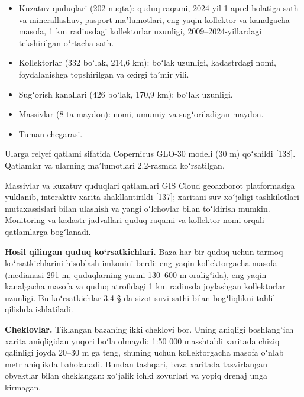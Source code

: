\begin{itemize}
\tightlist
\item
  Kuzatuv quduqlari (202 nuqta): quduq raqami, 2024-yil 1-aprel holatiga
  sath va minerallashuv, pasport maʼlumotlari, eng yaqin kollektor va
  kanalgacha masofa, 1 km radiusdagi kollektorlar uzunligi,
  2009--2024-yillardagi tekshirilgan oʻrtacha sath.
\item
  Kollektorlar (332 boʻlak, 214,6 km): boʻlak uzunligi, kadastrdagi
  nomi, foydalanishga topshirilgan va oxirgi taʼmir yili.
\item
  Sugʻorish kanallari (426 boʻlak, 170,9 km): boʻlak uzunligi.
\item
  Massivlar (8 ta maydon): nomi, umumiy va sugʻoriladigan maydon.
\item
  Tuman chegarasi.
\end{itemize}

Ularga relyef qatlami sifatida Copernicus GLO-30 modeli (30 m) qoʻshildi
{[}138{]}. Qatlamlar va ularning maʼlumotlari 2.2-rasmda koʻrsatilgan.



Massivlar va kuzatuv quduqlari qatlamlari GIS Cloud geoaxborot
platformasiga yuklanib, interaktiv xarita shakllantirildi {[}137{]};
xaritani suv xoʻjaligi tashkilotlari mutaxassislari bilan ulashish va
yangi oʻlchovlar bilan toʻldirish mumkin. Monitoring va kadastr
jadvallari quduq raqami va kollektor nomi orqali qatlamlarga bogʻlanadi.

\textbf{Hosil qilingan quduq koʻrsatkichlari.} Baza har bir quduq uchun
tarmoq koʻrsatkichlarini hisoblash imkonini berdi: eng yaqin
kollektorgacha masofa (medianasi 291 m, quduqlarning yarmi 130--600 m
oraligʻida), eng yaqin kanalgacha masofa va quduq atrofidagi 1 km
radiusda joylashgan kollektorlar uzunligi. Bu koʻrsatkichlar 3.4-§ da
sizot suvi sathi bilan bogʻliqlikni tahlil qilishda ishlatiladi.

\textbf{Cheklovlar.} Tiklangan bazaning ikki cheklovi bor. Uning
aniqligi boshlangʻich xarita aniqligidan yuqori boʻla olmaydi: 1:50 000
masshtabli xaritada chiziq qalinligi joyda 20--30 m ga teng, shuning
uchun kollektorgacha masofa oʻnlab metr aniqlikda baholanadi. Bundan
tashqari, baza xaritada tasvirlangan obyektlar bilan cheklangan:
xoʻjalik ichki zovurlari va yopiq drenaj unga kirmagan.

